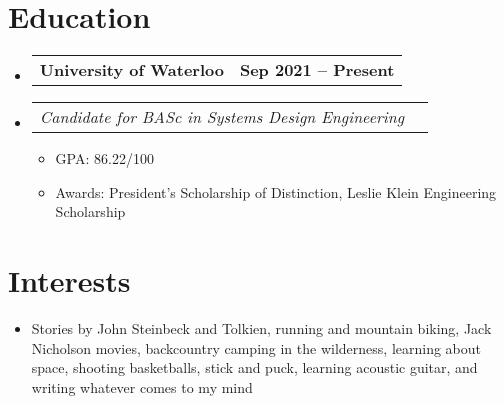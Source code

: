 \documentclass[letterpaper,11pt]{article}
\makeatletter
\newcommand{\subItem}[1]{
  \item\small{{#1 \vspace{-2pt}}}}
\newcommand{\subHeading}[2]{
  \vspace{-5pt}\item
  \begin{tabular*}{1.001\textwidth}{l@{\extracolsep{\fill}}r}
    \small#1 & \textbf{\small #2} 
    \setlength{\parskip}{6pt}
  \end{tabular*}\vspace{-7pt}}
\newcommand{\subHeadingListStart}{\begin{itemize}[leftmargin=0.0in, label={}]}
\newcommand{\subHeadingListEnd}{\end{itemize}}
\newcommand{\subItemListStart}{\begin{itemize}}
\newcommand{\subItemListEnd}{\end{itemize}\vspace{-5pt}}
\makeatother
\begin{document}
\section{\textcolor{main}{Education}}
  \subHeadingListStart

    \subHeading
      {\textbf{University of Waterloo}}
      {Sep 2021 -- Present}
      \vspace{-25pt}
    \subHeading
      {\emph{Candidate for BASc in Systems Design Engineering}}
      {\normalfont{\emph{Waterloo, Ontario}}}
    \subItemListStart
    \subItem{GPA: 86.22/100}
    \subItem{Awards: President's Scholarship of Distinction, Leslie Klein Engineering Scholarship}
    \subItemListEnd

  \subHeadingListEnd
\vspace{-18pt}

\section{\textcolor{main}{Interests}}
  \begin{itemize}[leftmargin=0in, label={}]
    \item\small{Stories by John Steinbeck and Tolkien, running and mountain biking, Jack Nicholson movies, backcountry camping in the wilderness, learning about space, shooting basketballs, stick and puck, learning acoustic guitar, and writing whatever comes to my mind}
  \end{itemize}
\vspace{-16pt}

\end{document}
